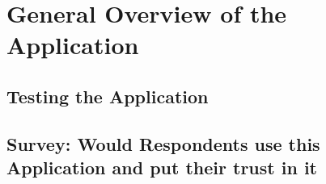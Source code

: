 

\chapter{General Overview of the Application}
\section{Testing the Application}
\section{Survey: Would Respondents use this Application and put their trust in it}

